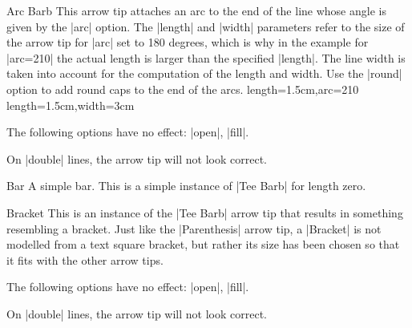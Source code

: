 \begin{arrowtip}{Arc Barb}{
    This arrow tip attaches an arc to the end of the line whose angle is given
    by the |arc| option. The |length| and |width| parameters refer to the size
    of the arrow tip for |arc| set to 180 degrees, which is why in the example
    for |arc=210| the actual length is larger than the specified |length|. The
    line width is taken into account for the computation  of the length and
    width. Use the |round| option to add round caps to the end of the arcs.
}%
{length=1.5cm,arc=210}%
{length=1.5cm,width=3cm}

    \begin{arrowexamples}
        \arrowexample[]
        \arrowexampledup[sep]
        \arrowexampledupdot[sep]
        \arrowexample[arc=120]
        \arrowexample[arc=270]
        \arrowexample[length=2pt]
        \arrowexample[length=2pt,width=5pt]
        \arrowexample[line width=2pt]
        \arrowexample[reversed]
        \arrowexample[round]
        \arrowexample[slant=.3]
        \arrowexample[left]
        \arrowexample[right]
        \arrowexample[red]
    \end{arrowexamples}
    The following options have no effect: |open|, |fill|.

    On |double| lines, the arrow tip will not look correct.
\end{arrowtip}

\begin{arrowtipsimple}{Bar}
    A simple bar. This is a simple instance of |Tee Barb| for length zero.
\end{arrowtipsimple}

\begin{arrowtip}{Bracket}{
    This is an instance of the |Tee Barb|  arrow tip that results in something
    resembling a bracket. Just like the |Parenthesis| arrow tip, a |Bracket| is
    not modelled from a text square bracket, but rather its size has been
    chosen so that it fits with the other arrow tips.
}%
{}%
{}

    \begin{arrowexamples}
        \arrowexample[]
        \arrowexampledup[sep]
        \arrowexampledupdot[sep]
        \arrowexample[reversed]
        \arrowexample[round]
        \arrowexample[slant=.3]
        \arrowexample[left]
        \arrowexample[right]
        \arrowexample[red]
    \end{arrowexamples}
    The following options have no effect: |open|, |fill|.

    On |double| lines, the arrow tip will not look correct.
\end{arrowtip}

